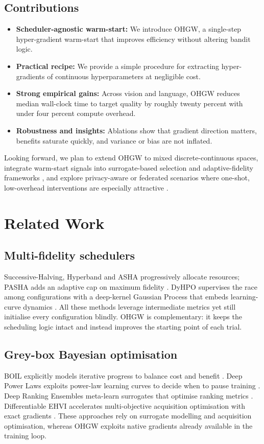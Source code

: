\documentclass{article}
\begin{document}
\subsection{Contributions}
\begin{itemize}
  \item \textbf{Scheduler-agnostic warm-start:} We introduce OHGW, a single-step hyper-gradient warm-start that improves efficiency without altering bandit logic.
  \item \textbf{Practical recipe:} We provide a simple procedure for extracting hyper-gradients of continuous hyperparameters at negligible cost.
  \item \textbf{Strong empirical gains:} Across vision and language, OHGW reduces median wall-clock time to target quality by roughly twenty percent with under four percent compute overhead.
  \item \textbf{Robustness and insights:} Ablations show that gradient direction matters, benefits saturate quickly, and variance or bias are not inflated.
\end{itemize}

Looking forward, we plan to extend OHGW to mixed discrete-continuous spaces, integrate warm-start signals into surrogate-based selection \cite{khazi-2023-deep} and adaptive-fidelity frameworks \cite{jiang-2024-efficient}, and explore privacy-aware or federated scenarios where one-shot, low-overhead interventions are especially attractive \cite{panda-2022-new,khodak-2021-federated}.

\section{Related Work}
\subsection{Multi-fidelity schedulers}
Successive-Halving, Hyperband and ASHA progressively allocate resources; PASHA adds an adaptive cap on maximum fidelity \cite{bohdal-2022-pasha}. DyHPO supervises the race among configurations with a deep-kernel Gaussian Process that embeds learning-curve dynamics \cite{wistuba-2022-supervising}. All these methods leverage intermediate metrics yet still initialise every configuration blindly. OHGW is complementary: it keeps the scheduling logic intact and instead improves the starting point of each trial.

\subsection{Grey-box Bayesian optimisation}
BOIL explicitly models iterative progress to balance cost and benefit \cite{nguyen-2019-bayesian}. Deep Power Laws exploits power-law learning curves to decide when to pause training \cite{kadra-2023-scaling}. Deep Ranking Ensembles meta-learn surrogates that optimise ranking metrics \cite{khazi-2023-deep}. Differentiable EHVI accelerates multi-objective acquisition optimisation with exact gradients \cite{daulton-2020-differentiable}. These approaches rely on surrogate modelling and acquisition optimisation, whereas OHGW exploits native gradients already available in the training loop.
\end{document}
